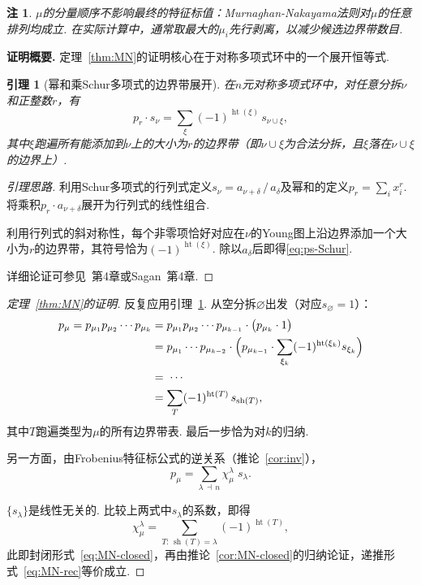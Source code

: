 \documentclass{sjtureport}
\newtheorem{lemma}[theorem]{引理}
\newtheorem{remark}{注}[chapter]
\begin{document}
\begin{remark}
    $\mu$的分量顺序不影响最终的特征标值：Murnaghan-Nakayama法则对$\mu$的任意排列均成立. 在实际计算中，通常取最大的$\mu_i$先行剥离，以减少候选边界带数目. 
\end{remark}

\medskip
\noindent\textbf{证明概要.}\quad
定理~\ref{thm:MN}的证明核心在于对称多项式环中的一个展开恒等式. 

\begin{lemma}[幂和乘Schur多项式的边界带展开]\label{lem:ps-Schur}
    在$n$元对称多项式环中，对任意分拆$\nu$和正整数$r$，有
    \begin{equation}\label{eq:ps-Schur}
        p_r \cdot s_\nu = \sum_{\xi} (-1)^{\operatorname{ht}(\xi)}\, s_{\nu\cup\xi},
    \end{equation}
    其中$\xi$跑遍所有能添加到$\nu$上的大小为$r$的边界带（即$\nu\cup\xi$为合法分拆，且$\xi$落在$\nu\cup\xi$的边界上）. 
\end{lemma}
\begin{proof}[引理思路]
    利用Schur多项式的行列式定义$s_\nu=a_{\nu+\delta}\,/\,a_\delta$及幂和的定义$p_r=\sum_i x_i^r$. 将乘积$p_r\cdot a_{\nu+\delta}$展开为行列式的线性组合.\par
    利用行列式的斜对称性，每个非零项恰好对应在$\nu$的Young图上沿边界添加一个大小为$r$的边界带，其符号恰为$(-1)^{\operatorname{ht}(\xi)}$. 除以$a_\delta$后即得\eqref{eq:ps-Schur}.\par
    详细论证可参见~\cite{FultonHarris}第4章或Sagan~\cite{Sagan}第4章. 
\end{proof}

\begin{proof}[定理~\ref{thm:MN}的证明]
    反复应用引理~\ref{lem:ps-Schur}. 从空分拆$\varnothing$出发（对应$s_\varnothing=1$）：
    \begin{align*}
        p_\mu = p_{\mu_1}p_{\mu_2}\cdots p_{\mu_k}
        &= p_{\mu_1}p_{\mu_2}\cdots p_{\mu_{k-1}}\cdot\bigl(p_{\mu_k}\cdot 1\bigr)  \\
        &= p_{\mu_1}\cdots p_{\mu_{k-2}}\cdot\Bigl(p_{\mu_{k-1}}\cdot\sum_{\xi_k}(-1)^{\operatorname{ht}(\xi_k)}s_{\xi_k}\Bigr)\\
        &=\;\cdots\\
        &=\sum_{T} (-1)^{\operatorname{ht}(T)}\, s_{\operatorname{sh}(T)},
    \end{align*}
    其中$T$跑遍类型为$\mu$的所有边界带表. 最后一步恰为对$k$的归纳. 

    另一方面，由Frobenius特征标公式的逆关系（推论~\ref{cor:inv}），
    \begin{equation*}
        p_\mu = \sum_{\lambda\,\dashv\, n} \chi^\lambda_\mu \; s_\lambda .
    \end{equation*}

    $\{s_\lambda\}$是线性无关的. 比较上两式中$s_\lambda$的系数，即得
    \begin{equation*}
        \chi^\lambda_\mu = \sum_{T:\,\operatorname{sh}(T)=\lambda} (-1)^{\operatorname{ht}(T)},
    \end{equation*}
    此即封闭形式~\eqref{eq:MN-closed}，再由推论~\ref{cor:MN-closed}的归纳论证，递推形式~\eqref{eq:MN-rec}等价成立. 
\end{proof}
\end{document}
